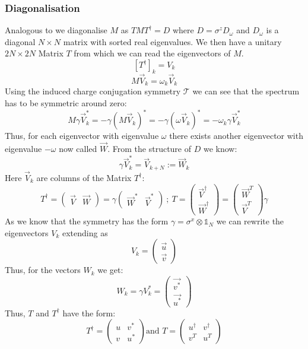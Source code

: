 \documentclass[Master]{subfiles}
\begin{document}
\subsubsection{Diagonalisation}
Analogous to \cite{blaizot1986quantum} we diagonalise $M$ as $TMT^{\dag} = D$ where $D = \sigma^z D_\omega$ and $D_\omega$ is a diagonal $N\times N$ matrix with sorted real eigenvalues.
We then have a unitary $2 N\times 2 N$ Matrix $T$ from which we can read the eigenvectors of $M$.
$$[T^{\dag}]_k = V_k$$
$$ M \vec{V}_k = \omega_k \vec{V}_k $$
Using the induced charge conjugation symmetry $\mathcal{T}$ we can see that the spectrum has to be symmetric around zero:
$$ M \gamma \vec{V}_k^* = -\gamma (M \vec{V}_k)^* = -\gamma(\omega \vec{V}_k)^* = - \omega_k \gamma \vec{V}_k^* $$
Thus, for each eigenvector with eigenvalue $\omega$ there exists another eigenvector with eigenvalue $-\omega$ now called $\vec{W}$. From the structure of $D$ we know:
$$ \gamma \vec{V}_k^*  = \vec{V}_{k+N} := \vec{W}_k$$
Here $\Vec{V}_k$ are columns of the Matrix $T^{\dag}$:
$$
T^{\dag}= 
\left(
\begin{array}{c|c}
   \vec{V}  & \vec{W} 
\end{array}\right) = 
\gamma
\left(
\begin{array}{c|c}
   \vec{W}^*  & \vec{V}^* 
\end{array}\right)
\ ;\ T = 
\left(
\begin{array}{c}
   \vec{V}^{\dag} \\
   \hline
   \vec{W}^{\dag}
\end{array}\right)
= 
\left(
\begin{array}{c}
   \vec{W}^T \\
   \hline
   \vec{V}^T
\end{array}\right)\gamma
$$
As we know that the symmetry has the form $ \gamma = \sigma^x \otimes \mathbb{1}_N $ we can rewrite the eigenvectors $V_k$ extending \cite{blaizot1986quantum} as 
$$
V_k = 
\left(
\begin{array}{c}
   \vec{u}\\
   \hline 
   \vec{v}
\end{array}\right)
$$
Thus, for the vectors $W_k$ we get:
$$
W_k =  \gamma V_k^* = \left(
\begin{array}{c}
   \vec{v^*}\\
   \hline 
   \vec{u^*}
\end{array}\right)
$$
Thus, $T$ and $T^{\dag}$ have the form:
$$
T^{\dag} = 
\left(
\begin{array}{c|c}
   u  &  v^* \\
   \hline 
   v &  u^*
\end{array}\right)
\text{and }
T = 
\left(
\begin{array}{c|c}
   u^{\dag}  &  v^{\dag} \\
   \hline 
   v^{T} &  u^{T}
\end{array}\right)
$$
\end{document}
